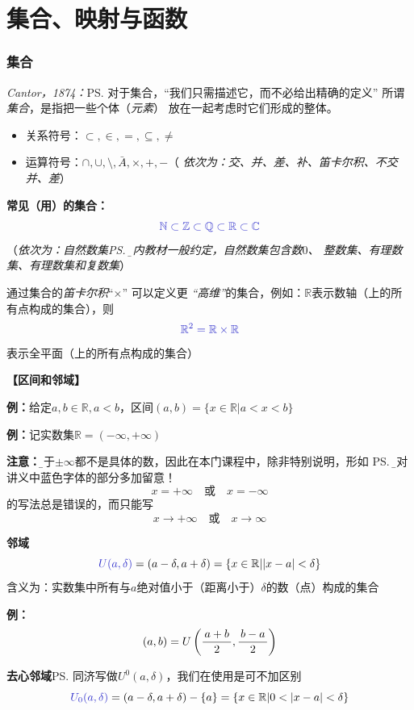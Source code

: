 
\section{集合、映射与函数}

\subsubsection{集合}

{\it Cantor，1874：}\ps{对于集合，“我们只需描述它，而不必给出精确的定义”}
所谓{\it 集合}，是指把一些个体（{\it 元素}） 放在一起考虑时它们形成的整体。
\begin{itemize}
  \setlength{\itemindent}{1cm}
  \item 关系符号：$\subset, \in, =, \subseteq, \neq$
  \item 运算符号：$\cap,\cup, \setminus, \bar{A}, \times, +, - $\quad （{\it
  依次为：交、并、差、补、笛卡尔积、不交并、差}）
\end{itemize}
	
{\bf 常见（用）的集合：}
$$\b\mathbb{N}\subset\mathbb{Z}\subset\mathbb{Q}
\subset\mathbb{R}\subset\mathbb{C}$$
\quad（{\it 依次为：自然数集\ps{\b 国内教材一般约定，自然数集包含数$0$}、
整数集、有理数集、有理数集和复数集}）


通过集合的{\it 笛卡尔积}“$\times$” 可以定义更{\it
“高维”}的集合，例如：$\mathbb{R}$表示数轴（上的所有点构成的集合），则
$${\b \mathbb{R}^2=\mathbb{R}\times\mathbb{R}}$$
表示全平面（上的所有点构成的集合）

{\bf 【区间和邻域】}

{\bf 例：}给定$a,b\in\mathbb{R},a<b$，区间$(a,b)=\{x\in\mathbb{R}|a<x<b\}$

{\bf 例：}记实数集$\mathbb{R}=(-\infty,+\infty)$

{\bf 注意：}{\b 由于$\pm\infty$都不是具体的数，因此在本门课程中，除非特别说明，形如
\ps{\b 请对讲义中蓝色字体的部分多加留意！}
$$x=+\infty\quad\mbox{或}\quad x=-\infty$$
的写法总是错误的，而只能写
$$x\to+\infty\quad\mbox{或}\quad x\to\infty$$
}

{\bf 邻域}
$${\b U(a,\delta)}=(a-\delta,a+\delta)=\{x\in\mathbb{R}||x-a|<\delta\}$$
含义为：实数集中所有与$a$绝对值小于（距离小于）$\delta$的数（点）构成的集合

{\bf 例：}
$$(a,b)=U\left(\displaystyle\frac{\,{a+b}\,}{\,{2}\,},\displaystyle\frac{\,{b-a}\,}{\,{2}\,}\right)$$

{\bf 去心邻域}\ps{同济写做$U^0(a,\delta)$，我们在使用是可不加区别}
$${\b
U_0(a,\delta)}=(a-\delta,a+\delta)-\{a\}=\{x\in\mathbb{R}|0<|x-a|<\delta\}$$

